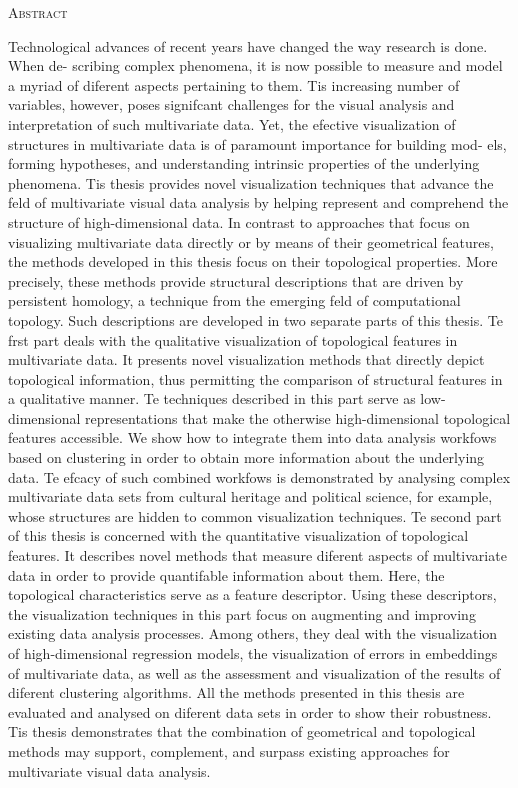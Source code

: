 \documentclass{mimosis}
\numberwithin{equation}{chapter}
\numberwithin{listing}{chapter}
\begin{document}
\newpage
\null
\thispagestyle{empty}
\newpage

\begin{center}
\begin{large}
  \textsc{Abstract}
\end{large}
\end{center}
%
\noindent
%

Technological advances of recent years have changed the way research is done. When de-
scribing complex phenomena, it is now possible to measure and model a myriad of diferent
aspects pertaining to them. Tis increasing number of variables, however, poses signifcant
challenges for the visual analysis and interpretation of such multivariate data. Yet, the efective
visualization of structures in multivariate data is of paramount importance for building mod-
els, forming hypotheses, and understanding intrinsic properties of the underlying phenomena.
Tis thesis provides novel visualization techniques that advance the feld of multivariate visual
data analysis by helping represent and comprehend the structure of high-dimensional data.
In contrast to approaches that focus on visualizing multivariate data directly or by means of
their geometrical features, the methods developed in this thesis focus on their topological
properties. More precisely, these methods provide structural descriptions that are driven by
persistent homology, a technique from the emerging feld of computational topology.
Such descriptions are developed in two separate parts of this thesis. Te frst part deals
with the qualitative visualization of topological features in multivariate data. It presents
novel visualization methods that directly depict topological information, thus permitting the
comparison of structural features in a qualitative manner. Te techniques described in this
part serve as low-dimensional representations that make the otherwise high-dimensional
topological features accessible. We show how to integrate them into data analysis workfows
based on clustering in order to obtain more information about the underlying data. Te
efcacy of such combined workfows is demonstrated by analysing complex multivariate data
sets from cultural heritage and political science, for example, whose structures are hidden to
common visualization techniques.
Te second part of this thesis is concerned with the quantitative visualization of topological
features. It describes novel methods that measure diferent aspects of multivariate data in
order to provide quantifable information about them. Here, the topological characteristics
serve as a feature descriptor. Using these descriptors, the visualization techniques in this part
focus on augmenting and improving existing data analysis processes. Among others, they
deal with the visualization of high-dimensional regression models, the visualization of errors
in embeddings of multivariate data, as well as the assessment and visualization of the results
of diferent clustering algorithms.
All the methods presented in this thesis are evaluated and analysed on diferent data sets in
order to show their robustness. Tis thesis demonstrates that the combination of geometrical
and topological methods may support, complement, and surpass existing approaches for
multivariate visual data analysis.
\clearpage
\end{document}
